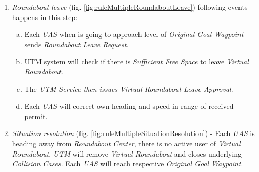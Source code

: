 \begin{enumerate}
        \item \emph{Roundabout leave} (fig. \ref{fig:ruleMultipleRoundaboutLeave})  following events happens in this step:
        \begin{enumerate}[a.]
            \item Each \emph{UAS} when is going to approach level of \emph{Original Goal Waypoint} sends \emph{Roundabout Leave Request}.
            
            \item UTM system will check if there is \emph{Sufficient Free Space} to leave \emph{Virtual Roundabout}.
            
            \item The \emph{UTM Service then issues} \emph{Virtual Roundabout Leave Approval}.
            
            \item Each \emph{UAS} will correct own heading and speed in range of received permit.
        \end{enumerate}   
        
        \item \emph{Situation resolution} (fig. \ref{fig:ruleMultipleSituationResolution}) - Each \emph{UAS} is heading away from \emph{Roundabout Center}, there is no active user of \emph{Virtual Roundabout}. \emph{UTM} will remove \emph{Virtual Roundabout}  and closes underlying \emph{Collision Cases}. Each \emph{UAS} will reach respective \emph{Original Goal Waypoint}.
    \end{enumerate}
    
